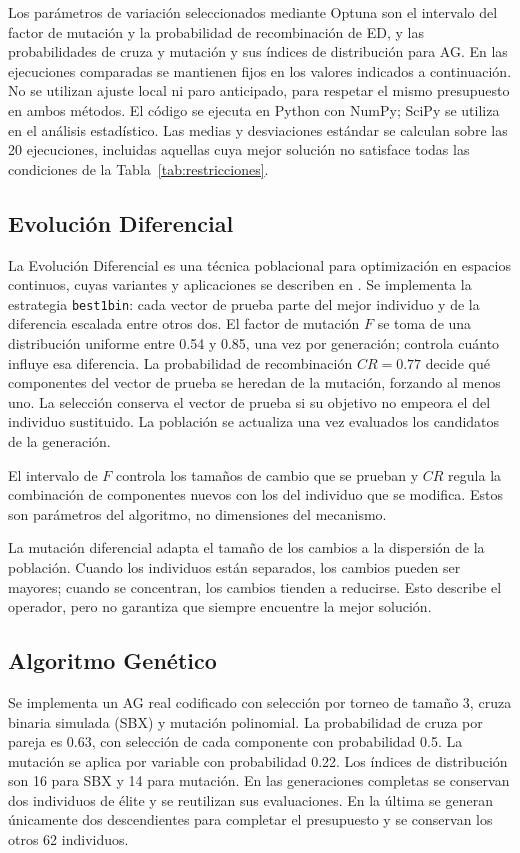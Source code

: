 \documentclass[conference,letterpaper]{IEEEtran}
\begin{document}
Los parámetros de variación seleccionados mediante Optuna \cite{r13} son el intervalo del factor de mutación y la probabilidad de recombinación de ED, y las probabilidades de cruza y mutación y sus índices de distribución para AG. En las ejecuciones comparadas se mantienen fijos en los valores indicados a continuación. No se utilizan ajuste local ni paro anticipado, para respetar el mismo presupuesto en ambos métodos. El código se ejecuta en Python con NumPy; SciPy se utiliza en el análisis estadístico. Las medias y desviaciones estándar se calculan sobre las 20 ejecuciones, incluidas aquellas cuya mejor solución no satisface todas las condiciones de la Tabla~\ref{tab:restricciones}.

\subsection{Evolución Diferencial}
La Evolución Diferencial es una técnica poblacional para optimización en espacios continuos, cuyas variantes y aplicaciones se describen en \cite{r14,r15}. Se implementa la estrategia \texttt{best1bin}: cada vector de prueba parte del mejor individuo y de la diferencia escalada entre otros dos. El factor de mutación $F$ se toma de una distribución uniforme entre 0.54 y 0.85, una vez por generación; controla cuánto influye esa diferencia. La probabilidad de recombinación $CR=0.77$ decide qué componentes del vector de prueba se heredan de la mutación, forzando al menos uno. La selección conserva el vector de prueba si su objetivo no empeora el del individuo sustituido. La población se actualiza una vez evaluados los candidatos de la generación.

El intervalo de $F$ controla los tamaños de cambio que se prueban y $CR$ regula la combinación de componentes nuevos con los del individuo que se modifica. Estos son parámetros del algoritmo, no dimensiones del mecanismo.

La mutación diferencial adapta el tamaño de los cambios a la dispersión de la población. Cuando los individuos están separados, los cambios pueden ser mayores; cuando se concentran, los cambios tienden a reducirse. Esto describe el operador, pero no garantiza que siempre encuentre la mejor solución.

\subsection{Algoritmo Genético}
Se implementa un AG real codificado con selección por torneo de tamaño 3, cruza binaria simulada (SBX) \cite{r16} y mutación polinomial. La probabilidad de cruza por pareja es 0.63, con selección de cada componente con probabilidad 0.5. La mutación se aplica por variable con probabilidad 0.22. Los índices de distribución son 16 para SBX y 14 para mutación. En las generaciones completas se conservan dos individuos de élite y se reutilizan sus evaluaciones. En la última se generan únicamente dos descendientes para completar el presupuesto y se conservan los otros 62 individuos.
\end{document}
